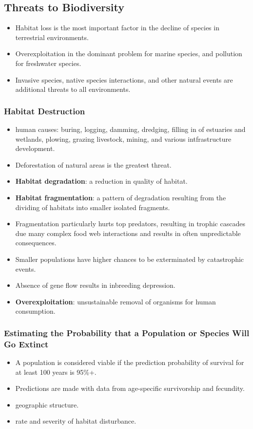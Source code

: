\documentclass[12pt,a4paper]{article}
\begin{document}
\subsection{Threats to Biodiversity}
\begin{itemize}
    \item Habitat loss is the most important factor in the decline of species in terrestrial environments.
    \item Overexploitation in the dominant problem for marine species, and pollution for freshwater species.
    \item Invasive species, native species interactions, and other natural events are additional threats to all environments.
\end{itemize}
\subsubsection{Habitat Destruction}
\begin{itemize}
    \item human causes: buring, logging, damming, dredging, filling in of estuaries and wetlands, plowing, grazing livestock, mining, and various intfrastructure development.
    \item Deforestation of natural areas is the greatest threat.
    \item \textbf{Habitat degradation}: a reduction in quality of habitat.
    \item \textbf{Habitat fragmentation}: a pattern of degradation resulting from the dividing of habitats into smaller isolated fragments.
    \item Fragmentation particularly hurts top predators, resulting in trophic cascades due many complex food web interactions and results in often unpredictable consequences.
    \item Smaller populations have higher chances to be exterminated by catastrophic events.
    \item Absence of gene flow results in inbreeding depression.
    \item \textbf{Overexploitation}: unsustainable removal of organisms for human consumption.
\end{itemize}

\subsubsection{Estimating the Probability that a Population or Species Will Go Extinct}
\begin{itemize}
    \item A population is considered viable if the prediction probability of survival for at least 100 years is 95\%+.
    \item Predictions are made with data from age-specific survivorship and fecundity.
    \item geographic structure.
    \item rate and severity of habitat disturbance.
\end{itemize}
\end{document}

